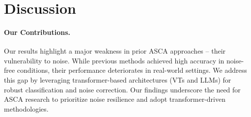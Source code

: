 
\section{Discussion}
\label{sec:discussion}

\paragraph{Our Contributions.}
Our results highlight a major weakness in prior ASCA approaches -- their vulnerability to noise. While previous methods achieved high accuracy in noise-free conditions, their performance deteriorates in real-world settings. We address this gap by leveraging transformer-based architectures (VTs and LLMs) for robust classification and noise correction. Our findings underscore the need for ASCA research to prioritize noise resilience and adopt transformer-driven methodologies.

